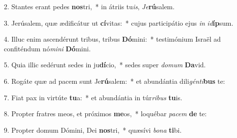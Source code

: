 2. Stantes erant pedes \textbf{nos}tri,~*  in átriis tu\textit{is}, \textit{Je}\textbf{rú}salem.\

3. Jerúsalem, quæ ædificátur ut \textbf{cí}vitas:~*  cujus participátio ejus \textit{in} \textit{id}\textbf{íp}sum.\

4. Illuc enim ascendérunt tribus, tribus \textbf{Dó}mini:~*  testimónium Israël ad confiténdum nó\textit{mi}\textit{ni} \textbf{Dó}mini.\

5. Quia illic sedérunt sedes in ju\textbf{dí}cio,~*  sedes super \textit{do}\textit{mum} \textbf{Da}vid.\

6. Rogáte quæ ad pacem sunt Je\textbf{rú}salem:~*  et abundántia dili\textit{gén}\textit{ti}\textbf{bus} te:\

7. Fiat pax in virtúte \textbf{tu}a:~*  et abundántia in túr\textit{ri}\textit{bus} \textbf{tu}is.\

8. Propter fratres meos, et próximos \textbf{me}os,~*  loquébar \textit{pa}\textit{cem} \textbf{de} te:\

9. Propter domum Dómini, Dei \textbf{nos}tri,~*  quæsívi \textit{bo}\textit{na} \textbf{ti}bi.\

